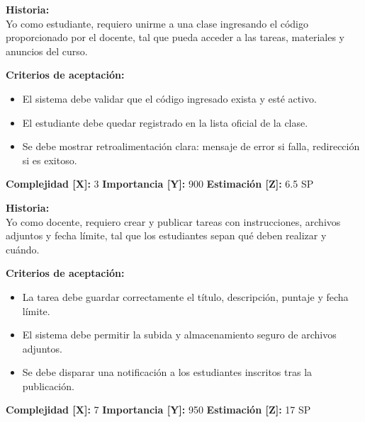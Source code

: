 \documentclass[12pt,a4paper]{article}
\begin{document}
\vspace{0.5em}

\begin{tcolorbox}[title=\textbf{HU-S1-02: Unirse a una clase mediante código de acceso}]
\textbf{Historia:} \\
Yo como estudiante, requiero unirme a una clase ingresando el código proporcionado por el docente, tal que pueda acceder a las tareas, materiales y anuncios del curso.

\vspace{0.5em}
\textbf{Criterios de aceptación:}
\begin{itemize}
    \item El sistema debe validar que el código ingresado exista y esté activo.
    \item El estudiante debe quedar registrado en la lista oficial de la clase.
    \item Se debe mostrar retroalimentación clara: mensaje de error si falla, redirección si es exitoso.
\end{itemize}
\textbf{Complejidad [X]:} 3 \hfill \textbf{Importancia [Y]:} 900 \hfill \textbf{Estimación [Z]:} 6.5 SP
\end{tcolorbox}

\vspace{0.5em}

\begin{tcolorbox}[title=\textbf{HU-S1-03: Publicar una tarea con fecha de entrega}]
\textbf{Historia:} \\
Yo como docente, requiero crear y publicar tareas con instrucciones, archivos adjuntos y fecha límite, tal que los estudiantes sepan qué deben realizar y cuándo.

\vspace{0.5em}
\textbf{Criterios de aceptación:}
\begin{itemize}
    \item La tarea debe guardar correctamente el título, descripción, puntaje y fecha límite.
    \item El sistema debe permitir la subida y almacenamiento seguro de archivos adjuntos.
    \item Se debe disparar una notificación a los estudiantes inscritos tras la publicación.
\end{itemize}
\textbf{Complejidad [X]:} 7 \hfill \textbf{Importancia [Y]:} 950 \hfill \textbf{Estimación [Z]:} 17 SP
\end{tcolorbox}

\vspace{1em}
\end{document}
